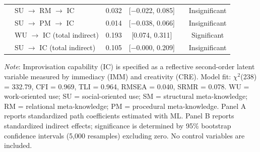 \documentclass[authoryear,preprint,review,times,10pt]{elsarticle}
\begin{document}
\begin{table}[!htbp]
\begin{threeparttable}
\begin{tabular*}{0.9\textwidth}{@{\extracolsep{\fill}}llcccc}
& SU $\rightarrow$ RM $\rightarrow$ IC & 0.032 & [$-$0.022, 0.085] & & Insignificant \\
& SU $\rightarrow$ PM $\rightarrow$ IC & 0.014 & [$-$0.038, 0.066] & & Insignificant \\
\midrule
& WU $\rightarrow$ IC (total indirect) & 0.193 & [0.074, 0.311] & & Significant \\
& SU $\rightarrow$ IC (total indirect) & 0.105 & [$-$0.000, 0.209] & & Insignificant \\
\bottomrule
\end{tabular*}
\begin{tablenotes}[flushleft]
\small\linespread{1}\selectfont
\item \textit{Note}: Improvisation capability (IC) is specified as a reflective second-order latent variable measured by immediacy (IMM) and creativity (CRE). Model fit: $\chi^{2}$(238) = 332.79, CFI = 0.969, TLI = 0.964, RMSEA = 0.040, SRMR = 0.078. WU = work-oriented use; SU = social-oriented use; SM = structural meta-knowledge; RM = relational meta-knowledge; PM = procedural meta-knowledge. Panel A reports standardized path coefficients estimated with ML. Panel B reports standardized indirect effects; significance is determined by 95\% bootstrap confidence intervals (5,000 resamples) excluding zero. No control variables are included.
\end{tablenotes}
\end{threeparttable}
\end{table}
\vspace{-15pt}
\end{document}
